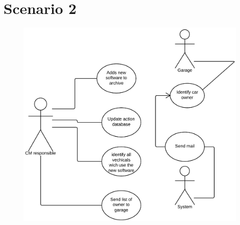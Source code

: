 \section{Scenario 2}

	\begin{figure}[H]
		\includegraphics[width=\textwidth]{pics/usecase2.png}
	\end{figure}


